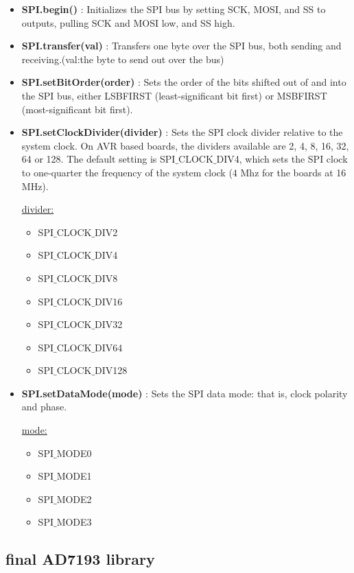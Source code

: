 \documentclass[10pt,a4paper]{report}
\begin{document}
\begin{itemize}
\item \textbf{SPI.begin() } : Initializes the SPI bus by setting SCK, MOSI, and SS to outputs, pulling SCK and MOSI low, and SS high. \\
\item \textbf{SPI.transfer(val)} : Transfers one byte over the SPI bus, both sending and receiving.(val:the byte to send out over the bus)  \\
\item \textbf{SPI.setBitOrder(order)} : Sets the order of the bits shifted out of and into the SPI bus, either LSBFIRST (least-significant bit first) or MSBFIRST (most-significant bit first). \\
\item \textbf{SPI.setClockDivider(divider)} : Sets the SPI clock divider relative to the system clock. On AVR based boards, the dividers available are 2, 4, 8, 16, 32, 64 or 128. The default setting is SPI$\_$CLOCK$\_$DIV4, which sets the SPI clock to one-quarter the frequency of the system clock (4 Mhz for the boards at 16 MHz). 

\underline{divider:}
\begin{itemize}
\item SPI$\_$CLOCK$\_$DIV2
\item SPI$\_$CLOCK$\_$DIV4
\item SPI$\_$CLOCK$\_$DIV8
\item SPI$\_$CLOCK$\_$DIV16
\item SPI$\_$CLOCK$\_$DIV32
\item SPI$\_$CLOCK$\_$DIV64
\item SPI$\_$CLOCK$\_$DIV128 
\end{itemize}

\item \textbf{SPI.setDataMode(mode)} : Sets the SPI data mode: that is, clock polarity and phase.

\underline{mode:} 
\begin{itemize}
\item SPI$\_$MODE0
\item SPI$\_$MODE1
\item SPI$\_$MODE2
\item SPI$\_$MODE3 
\end{itemize} 

\end{itemize}

\subsection{final AD7193 library}
\end{document}
